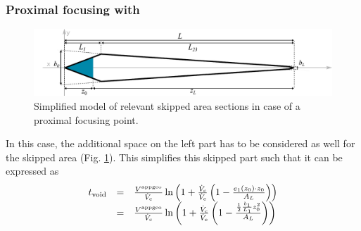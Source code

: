 \subsubsection*{Proximal focusing with }

\begin{figure}[H]
  \begin{center}
    \includegraphics[width=\linewidth]{./images/fffApprox2.pdf}
    \vspace*{-3ex}    
  \end{center}
  \caption[Skipped area section for proximal focussing, simplified approximation]{
    Simplified model of relevant skipped area sections in case of a proximal focusing  point.}
  \label{fig:fffApprox2}
\end{figure}
In this case, the additional space on the left part has to be considered as well for the skipped area (Fig. 
\ref{fig:fffApprox2}).
This simplifies this skipped part such that it can be expressed as 
\begin{equation}
 \begin{array}{lll}
  t_\text{void} &= & 
  \frac{V^{\text{appgeo}}}{\dot{V}_\text{c}} \ln{
    \left(
    1 + \frac{\ensuremath{\dot{V}_\text{c}}}{\ensuremath{\dot{V}_\text{e}}}
    \left(
    1 - \frac{
     e_1(z_0) \cdot z_0
    }{\ensuremath{A_L}}
    \right)
    \right)}
  \\ & = & 
   \frac{V^{\text{appgeo}}}{\dot{V}_\text{c}} \ln{
   \left(
   1 + \frac{\ensuremath{\dot{V}_\text{c}}}{\ensuremath{\dot{V}_\text{e}}}
   \left(
   1 - \frac{
    \frac{1}{2}\frac{b_1}{L_1} z_0^2
   }{\ensuremath{A_L}}
   \right)
   \right)}
 \\
 \end{array}
\end{equation}

